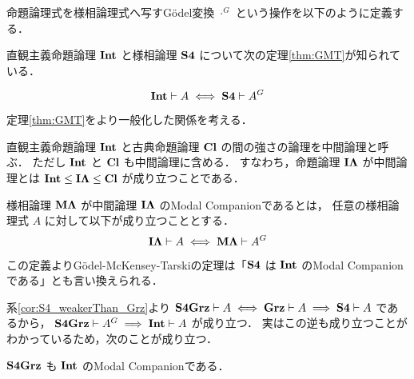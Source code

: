 \documentclass{jlreq}
\begin{document}
\begin{definition}[Gödel変換]
	命題論理式を様相論理式へ写すGödel変換 $\cdot^G$ という操作を以下のように定義する．
\end{definition}

直観主義命題論理 $\mathbf{Int}$ と様相論理 $\mathbf{S4}$ について次の定理\ref{thm:GMT}が知られている．

\begin{theorem}\label{thm:GMT}
	\begin{equation*}
		\mathbf{Int} \vdash A \iff \mathbf{S4} \vdash A^G
	\end{equation*}
\end{theorem}

定理\ref{thm:GMT}をより一般化した関係を考える．

\begin{definition}[中間論理]
	直観主義命題論理 $\mathbf{Int}$ と古典命題論理 $\mathbf{Cl}$ の間の強さの論理を中間論理と呼ぶ．
	ただし $\mathbf{Int}$ と $\mathbf{Cl}$ も中間論理に含める．
	すなわち，命題論理 $\mathbf{I\Lambda}$ が中間論理とは $\mathbf{Int} \leq \mathbf{I\Lambda} \leq \mathbf{Cl}$ が成り立つことである．
\end{definition}

\begin{definition}
	様相論理 $\mathbf{M\Lambda}$ が中間論理 $\mathbf{I\Lambda}$ のModal Companionであるとは，
	任意の様相論理式 $A$ に対して以下が成り立つこととする．
	\begin{equation*}
		\mathbf{I\Lambda} \vdash A \iff \mathbf{M\Lambda} \vdash A^G
	\end{equation*}
\end{definition}

この定義よりGödel-McKensey-Tarskiの定理は「$\mathbf{S4}$ は $\mathbf{Int}$ のModal Companionである」とも言い換えられる．


系\ref{cor:S4_weakerThan_Grz}より $\mathbf{S4Grz} \vdash A \iff \mathbf{Grz} \vdash A \implies \mathbf{S4} \vdash A$ であるから，
$\mathbf{S4Grz} \vdash A^G \implies \mathbf{Int} \vdash A$ が成り立つ．
実はこの逆も成り立つことがわかっているため，次のことが成り立つ．

\begin{theorem}
	$\mathbf{S4Grz}$ も $\mathbf{Int}$ のModal Companionである．
\end{theorem}
\end{document}
